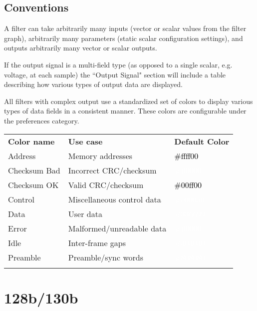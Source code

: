 \subsection{Conventions}

A filter can take arbitrarily many inputs (vector or scalar values from the filter graph), arbitrarily many parameters
(static scalar configuration settings), and outputs arbitrarily many vector or scalar outputs.

If the output signal is a multi-field type (as opposed to a single scalar, e.g. voltage, at each sample) the
``Output Signal" section will include a table describing how various types of output data are displayed.

All filters with complex output use a standardized set of colors to display various types of data fields in a
consistent manner. These colors are configurable under the  preferences category.

\begin{tabularx}{16cm}{llX}
\thickhline
\textbf{Color name} & \textbf{Use case} & \textbf{Default Color} \\
\thickhline
Address & Memory addresses & \cellcolor{address}\textcolor{black}{\#ffff00} \\
\thinhline
Checksum Bad & Incorrect CRC/checksum & \cellcolor{checksumbad}\textcolor{white}{\#ff0000} \\
\thinhline
Checksum OK & Valid CRC/checksum & \cellcolor{checksumok}\textcolor{black}{\#00ff00} \\
\thinhline
Control & Miscellaneous control data & \cellcolor{control}\textcolor{white}{\#c000a0} \\
\thinhline
Data & User data & \cellcolor{data}\textcolor{white}{\#336699} \\
\thinhline
Error & Malformed/unreadable data & \cellcolor{error}\textcolor{white}{\#ff0000} \\
\thinhline
Idle & Inter-frame gaps & \cellcolor{idle}\textcolor{white}{\#404040} \\
\thinhline
Preamble & Preamble/sync words & \cellcolor{preamble}\textcolor{white}{\#808080} \\
\thickhline
\end{tabularx}

\pagebreak
\section{128b/130b}
\label{filter:128b130b}

